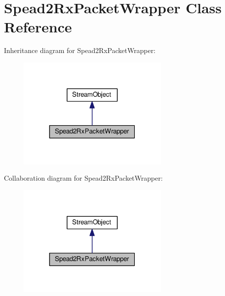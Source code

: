 \hypertarget{class_spead2_rx_packet_wrapper}{}\section{Spead2\+Rx\+Packet\+Wrapper Class Reference}
\label{class_spead2_rx_packet_wrapper}


Inheritance diagram for Spead2\+Rx\+Packet\+Wrapper\+:\nopagebreak
\begin{figure}[H]
\begin{center}
\leavevmode
\includegraphics[width=210pt]{class_spead2_rx_packet_wrapper__inherit__graph}
\end{center}
\end{figure}


Collaboration diagram for Spead2\+Rx\+Packet\+Wrapper\+:\nopagebreak
\begin{figure}[H]
\begin{center}
\leavevmode
\includegraphics[width=210pt]{class_spead2_rx_packet_wrapper__coll__graph}
\end{center}
\end{figure}
